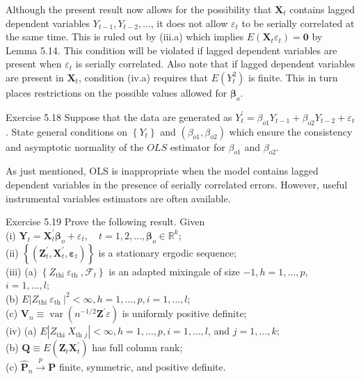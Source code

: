 \documentclass[10pt]{article}
\begin{document}
Although the present result now allows for the possibility that $\mathbf{X}_{t}$ contains lagged dependent variables $Y_{t-1}, Y_{t-2}, \ldots$, it does not allow $\varepsilon_{t}$ to be serially correlated at the same time. This is ruled out by (iii.a) which implies $E\left(\mathbf{X}_{t} \varepsilon_{t}\right)=\mathbf{0}$ by Lemma 5.14. This condition will be violated if lagged dependent variables are present when $\varepsilon_{t}$ is serially correlated. Also note that if lagged dependent variables are present in $\mathbf{X}_{t}$, condition (iv.a) requires that $E\left(Y_{t}^{2}\right)$ is finite. This in turn places restrictions on the possible values allowed for $\boldsymbol{\beta}_{o}$.

Exercise 5.18 Suppose that the data are generated as $Y_{t}^{\prime}=\beta_{o 1} Y_{t-1}+ \beta_{o 2} Y_{t-2}+\varepsilon_{t}$. State general conditions on $\left\{Y_{t}\right\}$ and $\left(\beta_{o 1}, \beta_{o 2}\right)$ which ensure the consistency and asymptotic normality of the $O L S$ estimator for $\beta_{o 1}$ and $\beta_{o 2}$.

As just mentioned, OLS is inappropriate when the model contains lagged dependent variables in the presence of serially correlated errors. However, useful instrumental variables estimators are often available.

Exercise 5.19 Prove the following result. Given\\
(i) $\mathbf{Y}_{t}=\mathbf{X}_{t}^{\prime} \boldsymbol{\beta}_{o}+\varepsilon_{t}, \quad t=1,2, \ldots, \boldsymbol{\beta}_{o} \in \mathbb{R}^{k}$;\\
(ii) $\left\{\left(\mathbf{Z}_{t}^{\prime}, \mathbf{X}_{t}^{\prime}, \boldsymbol{\varepsilon}_{t}\right)\right\}$ is a stationary ergodic sequence;\\
(iii) (a) $\left\{Z_{\text {thi }} \varepsilon_{\text {th }}, \mathcal{F}_{t}\right\}$ is an adapted mixingale of size $-1, h=1, \ldots, p$, $i=1, \ldots, l ;$\\
(b) $E\left|Z_{\text {thi }} \varepsilon_{\text {th }}\right|^{2}<\infty, h=1, \ldots, p, i=1, \ldots, l$;\\
(c) $\mathbf{V}_{n} \equiv \operatorname{var}\left(n^{-1 / 2} \mathbf{Z}^{\prime} \varepsilon\right)$ is uniformly positive definite;\\
(iv) (a) $E\left|Z_{\text {thi }} X_{\text {th } j}\right|<\infty, h=1, \ldots, p, i=1, \ldots, l$, and $j=1, \ldots, k$;\\
(b) $\mathbf{Q} \equiv E\left(\mathbf{Z}_{t} \mathbf{X}_{t}^{\prime}\right)$ has full column rank;\\
(c) $\hat{\mathbf{P}}_{n} \xrightarrow{p} \mathbf{P}$ finite, symmetric, and positive definite.
\end{document}
